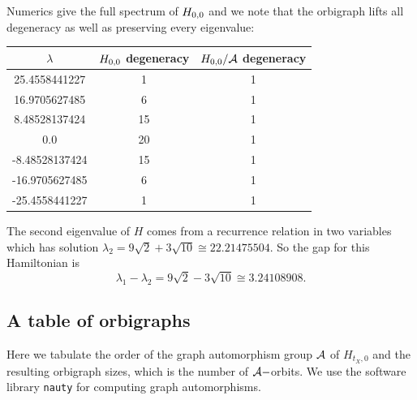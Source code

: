 
Numerics give the full spectrum of $H_{0,0}$ and we note that the orbigraph lifts
all degeneracy as well as preserving every eigenvalue:
\begin{center}
\begin{tabular}{ c|c|c } 
$\lambda$ & $H_{0,0}$ degeneracy & $H_{0,0}/\mathcal{A}$ degeneracy \\
\hline
    25.4558441227 & 1 & 1 \\
    16.9705627485 & 6 & 1 \\
    8.48528137424 & 15 & 1 \\
    0.0 & 20 & 1 \\
    -8.48528137424 & 15 & 1 \\
    -16.9705627485 & 6 & 1 \\
    -25.4558441227 & 1 & 1 \\
\end{tabular}
\end{center}

The second eigenvalue of $H$ comes from a recurrence
relation in two variables which has solution
$\lambda_2 = 9\sqrt{2} + 3\sqrt{10} \cong 22.21475504.$
So the gap for this Hamiltonian  is 
$$\lambda_1 - \lambda_2 = 9\sqrt{2} - 3\sqrt{10} \cong 3.24108908.$$



%
\subsection{A table of orbigraphs}\label{OrbigraphTable}

Here we tabulate the order of the graph automorphism group $\mathcal{A}$ of $H_{t_X,0}$
and the resulting orbigraph sizes, which is the number of $\mathcal{A}-$orbits.
We use the software library {\tt nauty}\cite{McKay2014} for computing graph automorphisms.

